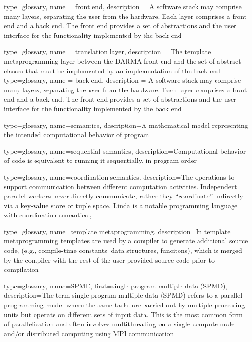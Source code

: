 {
  type=glossary,
  name = {front end},
  description = {A software stack may comprise many layers, separating the 
    user from the hardware.  Each layer comprises a front end
      and a \gls{back end}.  The front end provides a set of abstractions and the
      user interface for the functionality implemented by the back end}
}

{
  type=glossary,
  name = {translation layer},
  description = {The \CC \gls{template metaprogramming} layer between the
    DARMA \gls{front end} and the set of abstract classes that must be implemented
    by an implementation of the \gls{back end}}
}
{
  type=glossary,
  name = {back end},
  description = {A software stack may comprise many layers, separating the 
    user from the hardware.  Each layer comprises a \gls{front end}
      and a back end.  The front end provides a set of abstractions and the
      user interface for the functionality implemented by the back end}
}

{
  type=glossary,
    name={semantics},
    description={A mathematical model representing the intended computational behavior of program}
}

{
  type=glossary,
  name={sequential semantics},
  description={Computational behavior of code is equivalent to running it
    sequentially, in program order}
}

{
  type=glossary,
  name={coordination semantics},
  description={The operations to support communication between different
    computation activities. Independent parallel workers never directly
      communicate, rather they ``coordinate'' indirectly via a \gls{key-value
        store} or \gls{tuple space}. \gls{Linda} is a notable \gls{programming
        language} with coordination semantics
  },
}


{
  type=glossary,
  name={template metaprogramming},
  description={In template metaprogramming templates are used by a compiler to
    generate additional source code, (e.g., compile-time constants, data
        structures, funcitons), which is merged by the compiler with the rest
      of the user-provided source code prior to compilation} 
}

{
  type=glossary,
  name={SPMD},
  first={single-program multiple-data (SPMD)},
  description={The term single-program multiple-data (SPMD) refers to a parallel \gls{programming model} where the same tasks are carried out by multiple processing units but operate on different sets of input data. This is the most common form of parallelization and often involves multithreading on a single compute node and/or distributed computing using \gls{MPI} communication}
}




